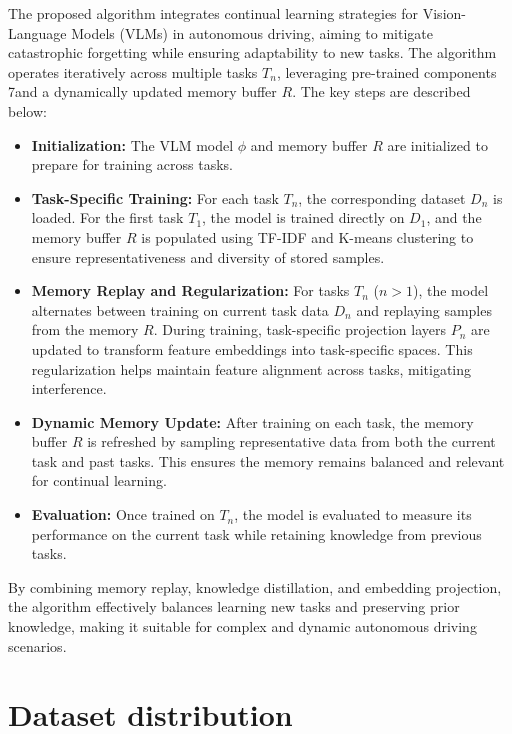 The proposed algorithm integrates continual learning strategies for Vision-Language Models (VLMs) in autonomous driving, aiming to mitigate catastrophic forgetting while ensuring adaptability to new tasks. The algorithm operates iteratively across multiple tasks \( T_n \), leveraging pre-trained components 7and a dynamically updated memory buffer \( R \). The key steps are described below:

\begin{itemize}
    \item \textbf{Initialization:} The VLM model \( \phi \) and memory buffer \( R \) are initialized to prepare for training across tasks.
    \item \textbf{Task-Specific Training:}
For each task \( T_n \), the corresponding dataset \( D_n \) is loaded.
For the first task \( T_1 \), the model is trained directly on \( D_1 \), and the memory buffer \( R \) is populated using TF-IDF and K-means clustering to ensure representativeness and diversity of stored samples.
    \item \textbf{Memory Replay and Regularization:}
For tasks \( T_n \) (\( n > 1 \)), the model alternates between training on current task data \( D_n \) and replaying samples from the memory \( R \).
During training, task-specific projection layers \( P_n \) are updated to transform feature embeddings into task-specific spaces. This regularization helps maintain feature alignment across tasks, mitigating interference.
    \item \textbf{Dynamic Memory Update:}
After training on each task, the memory buffer \( R \) is refreshed by sampling representative data from both the current task and past tasks. This ensures the memory remains balanced and relevant for continual learning.
    \item \textbf{Evaluation:} Once trained on \( T_n \), the model is evaluated to measure its performance on the current task while retaining knowledge from previous tasks.
\end{itemize}

By combining memory replay, knowledge distillation, and embedding projection, the algorithm effectively balances learning new tasks and preserving prior knowledge, making it suitable for complex and dynamic autonomous driving scenarios. 










\section{Dataset distribution}

